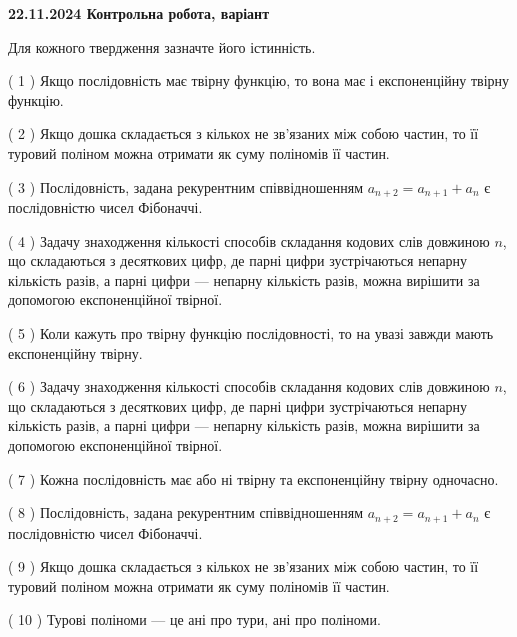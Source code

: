 \documentclass[12pt, ukrainian]{article}
\begin{document}
\vspace{4mm}
\newpage
\begin {large}

\textbf{22.11.2024 Контрольна робота, варіант  }\par


{
Для кожного твердження зазначте його істинність.\par
\vspace{2mm}
( 1 ) Якщо послідовність має твірну функцію, то вона має і експоненційну твірну функцію.%

( 2 ) Якщо дошка складається з кількох не зв’язаних між собою частин, то її туровий поліном можна отримати як суму поліномів її частин.%

( 3 ) Послідовність, задана рекурентним співвідношенням $a_{n+2}=a_{n+1}+a_{n}$ є послідовністю чисел Фібоначчі.%

( 4 ) Задачу знаходження кількості способів складання кодових слів довжиною $n$, що складаються з десяткових цифр, де парні цифри зустрічаються непарну кількість разів, а парні цифри — непарну кількість разів, можна вирішити за допомогою експоненційної твірної.%

( 5 ) Коли кажуть про твірну функцію послідовності, то на увазі завжди мають експоненційну твірну.%

( 6 ) Задачу знаходження кількості способів складання кодових слів довжиною $n$, що складаються з десяткових цифр, де парні цифри зустрічаються непарну кількість разів, а парні цифри — непарну кількість разів, можна вирішити за допомогою експоненційної твірної.%

( 7 ) Кожна послідовність має або ні твірну та експоненційну твірну одночасно.%

( 8 ) Послідовність, задана рекурентним співвідношенням $a_{n+2}=a_{n+1}+a_{n}$ є послідовністю чисел Фібоначчі.%

( 9 ) Якщо дошка складається з кількох не зв’язаних між собою частин, то її туровий поліном можна отримати як суму поліномів її частин.%

( 10 ) Турові поліноми --- це ані про тури, ані про поліноми.%


\vspace{5mm}
}
\end {large}
\end{document}
